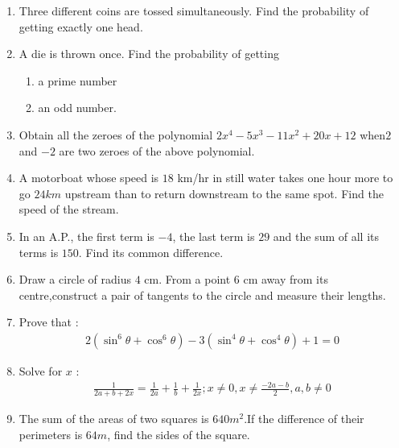 \documentclass[12pt,-letter paper]{article}
\begin{document}
\begin{enumerate}
\item Three different coins are tossed simultaneously. Find the probability of getting exactly one head.

\item A die is thrown once. Find the probability of getting
\begin{enumerate}
    \item a prime number
    \item an odd number. 
\end{enumerate}
  
\item Obtain all the zeroes of the polynomial $2x^4- 5x^3- 11x^2 + 20x + 12$ when$ 2 $and $- 2$ are two zeroes of the above polynomial. 

\item A motorboat whose speed is $18$ km/hr in still water takes one hour more to go $24 km$ upstream than to return downstream to the same spot. Find the speed of the stream.

\item In an A.P., the first term is $- 4$, the last term is $29$ and the sum of all its terms is $150$. Find its common difference.

\item Draw a circle of radius $4$ cm. From a point $6$ cm away from its centre,construct a pair of tangents to the circle and measure their lengths.
\item Prove that :
\begin{align*}
    2 (\sin^6\theta +\cos^6\theta) - 3 (\sin^4\theta + \cos^4\theta) + 1 = 0
\end{align*}

\item Solve for $x$ :
\begin{align*}
    \frac{1}{2a+ b +2x} = \frac{1}{2a}+\frac{1}{b}+\frac{1}{2x};x\neq0,x\neq\frac{-2a-b}{2},a,b\neq0
\end{align*}

\item The sum of the areas of two squares is $640 m^2$.If the difference of their perimeters is $64m$, find the sides of the square.

\end{enumerate}
\end{document}
